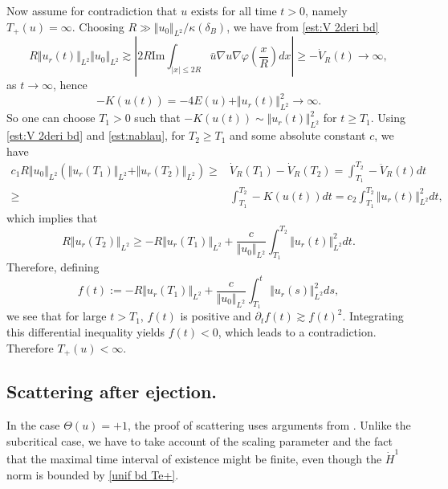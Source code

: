 \documentclass[reqno, 11pt]{amsart}
\numberwithin{equation}{section}
\theoremstyle{plain}
\theoremstyle{definition}
\numberwithin{equation}{section}
\numberwithin{theorem}{section}
\numberwithin{equation}{section}
\renewcommand{\Im}{\mathrm{Im}}
\numberwithin{equation}{section}
\numberwithin{theorem}{section}
\begin{document}
	Now assume for contradiction that $u$ exists for all time $t>0$, namely $T_+(u)=\infty$. Choosing $R\gg \Vert u_0\Vert_{L^2}/\kappa(\delta_{B})$, we have from \eqref{est:V 2deri bd}
	\begin{equation}\label{est:nablau}
	R\Vert u_r(t)\Vert_{L^2}\Vert u_0\Vert_{L^2} \gtrsim|2R\Im\int_{|x|\leq 2R}\bar{u}\nabla u\nabla\varphi(\frac{x}{R})dx|\geq -\dot{V}_R(t)\rightarrow \infty,
	\end{equation}
	as $t\rightarrow \infty$, hence 
	\begin{equation*}
	-K(u(t))=-4E(u)+ \Vert u_r(t)\Vert_{L^2}^2\rightarrow \infty.
	\end{equation*}
	So one can choose $T_1>0$ such that $-K(u(t))\sim \Vert u_r(t)\Vert_{L^2}^2$ for $t\geq T_1$. Using \eqref{est:V 2deri bd} and \eqref{est:nablau}, for $T_2\geq T_1$ and some absolute constant $c$, we have
	\begin{equation*}
	\begin{aligned}
	c_1R\Vert u_0\Vert_{L^2} \left(\Vert u_r(T_1)\Vert_{L^2}+\Vert u_r(T_2)\Vert_{L^2}\right)\geq& \dot{V}_R(T_1)-\dot{V}_R(T_2)=\int_{T_1}^{T_2}-\ddot{V}_R(t)dt\\\geq& \int_{T_1}^{T_2}-K(u(t))dt=c_2\int_{T_1}^{T_2}\Vert u_r(t)\Vert_{L^2}^2dt,
	\end{aligned}
	\end{equation*}
	which implies that
	\begin{equation*}
	R\Vert u_r(T_2)\Vert_{L^2} \geq -R\Vert u_r(T_1)\Vert_{L^2}+\frac{c}{\Vert u_0\Vert_{L^2}} \int_{T_1}^{T_2} \Vert u_r(t)\Vert_{L^2}^2 dt.
	\end{equation*}
	Therefore, defining
	\begin{equation*}
	f(t):= -R\Vert u_r(T_1)\Vert_{L^2}+\frac{c}{\Vert u_0\Vert_{L^2}} \int_{T_1}^{t} \Vert u_r(s)\Vert_{L^2}^2 ds,
	\end{equation*}
	we see that for large $t>T_1$, $f(t)$ is positive and $\partial_{t}f(t)\gtrsim f(t)^2$. Integrating this differential inequality yields $f(t)<0$, which leads to a contradiction. Therefore $T_+(u)<\infty$.
	
	
	
	\subsection{Scattering after ejection.} In the case $\Theta(u)=+1$, the proof of scattering uses arguments from \cite{MXZ:crit Hart:f rad,NakS:NLS}. Unlike the subcritical case, we have to take account of the scaling parameter and the fact that the maximal time interval of existence might be finite, even though the $\dot H^1$ norm is bounded by \eqref{unif bd Te+}. 
	
\end{document}
